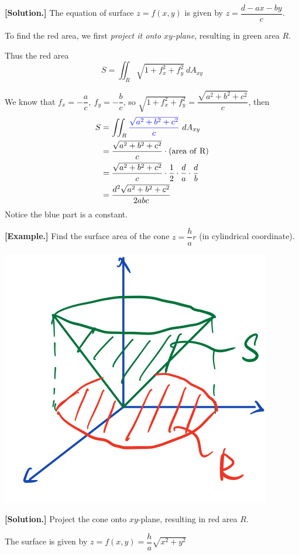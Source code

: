 \documentclass[11pt, a4paper]{MATH2023}
\newcommand{\eg}{\textbf{[Example.] }}
\newcommand{\sol}{\textbf{[Solution.] }}
\begin{document}
\begin{spacing}{1.3}
    \sol The equation of surface $z=f(x,y)$ is given by $z=\dfrac{d-ax-by}{c}$.

    To find the red area, we first {\it project it onto $xy$-plane}, resulting in green area $R$.

    Thus the red area $$S=\iint_R\sqrt{1+f_x^2+f_y^2}\ dA_{xy}$$

    We know that $f_x=-\dfrac{a}{c},\ f_y=-\dfrac{b}{c}$, so 
    $\sqrt{1+f_x^2+f_y^2}=\dfrac{\sqrt{a^2+b^2+c^2}}{c}$, then
    \begin{align*}
        S &= \iint_R{\blue \dfrac{\sqrt{a^2+b^2+c^2}}{c}}\ dA_{xy}\\
          &= \dfrac{\sqrt{a^2+b^2+c^2}}{c}\cdot {\rm (area\ of\ R)}\\
          &= \dfrac{\sqrt{a^2+b^2+c^2}}{c}\cdot \frac{1}{2}\cdot \frac{d}{a}\cdot \frac{d}{b}\\
          &= \frac{d^2\sqrt{a^2+b^2+c^2}}{2abc}
    \end{align*}
    Notice the blue part is a constant.

    \newpage
    \eg Find the surface area of the cone $z=\dfrac{h}{a}r$ (in cylindrical coordinate).
    \begin{center}
        \includegraphics[scale=0.25]{images/Ch14-surface-area-eg2.jpeg}
    \end{center}

    \sol Project the cone onto $xy$-plane, resulting in red area $R$.

    The surface is given by $z=f(x,y)=\dfrac{h}{a}\sqrt{x^2+y^2}$


\end{spacing}
\end{document}
